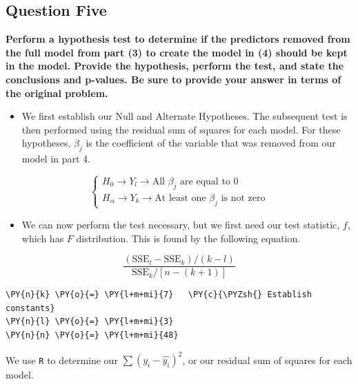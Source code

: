 \documentclass[10pt]{article}\usepackage[]{graphicx}\usepackage[]{xcolor}
\begin{document}
    \subsection*{Question Five}
    \textbf{Perform a hypothesis test to determine if the predictors removed from the full model from part (3) to create
    the model in (4) should be kept in the model. Provide the hypothesis, perform the test, and state the conclusions
    and p-values. Be sure to provide your answer in terms of the original problem.}\newline

    \begin{itemize}
    \itemsep1pt\parskip0pt
    \item
      We first establish our Null and Alternate Hypotheses. The subsequent
      test is then performed using the residual sum of squares for each
      model. For these hypotheses, $\beta_j$ is the coefficient of the
      variable that was removed from our model in part 4.
    \end{itemize}

\begin{equation*}
    \begin{cases}
        H_0 \to Y_l \to \text{All $\beta_j$ are equal to 0}\\
        H_\alpha \to Y_k \to \text{At least one $\beta_j$ is not zero}
    \end{cases}
\end{equation*}

\begin{itemize}
\itemsep1pt\parskip0pt
\item
  We can now perform the test necessary, but we first need our test statistic, $f$, which has $F$ distribution. This is
  found by the following equation.
\end{itemize}

\begin{equation}
    \frac{\left( \text{SSE}_l - \text{SSE}_k \right) / (k - l)}
    {\text{SSE}_k / \left[ n - (k + 1) \right]}
\end{equation}

    \begin{Verbatim}[commandchars=\\\{\}]
\PY{n}{k} \PY{o}{=} \PY{l+m+mi}{7}   \PY{c}{\PYZsh{} Establish constants}
\PY{n}{l} \PY{o}{=} \PY{l+m+mi}{3}
\PY{n}{n} \PY{o}{=} \PY{l+m+mi}{48}
\end{Verbatim}

    We use \texttt{R} to determine our $\sum {\left( y_i - \hat{y_i} \right)}^2$, or our residual sum of squares for
    each model.
\end{document}
